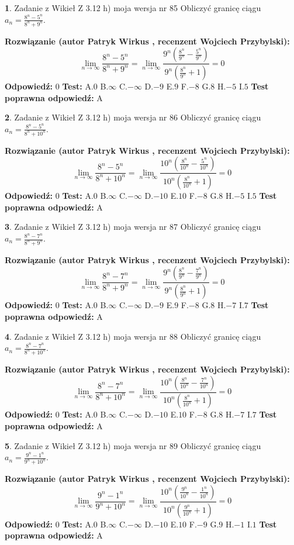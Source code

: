 \documentclass[12pt, a4paper]{article}
\theoremstyle{definition} %
\newtheorem{zad}{}
\newcommand{\zadStart}[1]{\begin{zad}#1\newline}
\newcommand{\zadStop}{\end{zad}}
\newcommand{\rozwStart}[2]{\noindent \textbf{Rozwiązanie (autor #1 , recenzent #2): }\newline}
\newcommand{\rozwStop}{\newline}
\newcommand{\odpStart}{\noindent \textbf{Odpowiedź:}\newline}
\newcommand{\odpStop}{\newline}
\newcommand{\testStart}{\noindent \textbf{Test:}\newline}
\newcommand{\testStop}{\newline}
\newcommand{\kluczStart}{\noindent \textbf{Test poprawna odpowiedź:}\newline}
\newcommand{\kluczStop}{\newline}
\begin{document}
\zadStart{Zadanie z Wikieł Z 3.12 h) moja wersja nr 85}
Obliczyć granicę ciągu $a_{n}=\frac{8^{n} - 5^{n}}{8^{n} + 9^{n}}$.
\zadStop
\rozwStart{Patryk Wirkus}{Wojciech Przybylski}
$$\lim\limits_{n\to\infty}\frac{8^{n} - 5^{n}}{8^{n} + 9^{n}} = \lim\limits_{n\to\infty}\frac{9^{n}(\frac{8^{n}}{9^{n}} - \frac{5^{n}}{9^{n}})}{9^{n}(\frac{8^{n}}{9^{n}} + 1)} = 0$$
\rozwStop
\odpStart
$0$
\odpStop
\testStart
A.$0$
B.$\infty$
C.$-\infty$
D.$-9$
E.$9$
F.$-8$
G.$8$
H.$-5$
I.$5$
\testStop
\kluczStart
A
\kluczStop



\zadStart{Zadanie z Wikieł Z 3.12 h) moja wersja nr 86}
Obliczyć granicę ciągu $a_{n}=\frac{8^{n} - 5^{n}}{8^{n} + 10^{n}}$.
\zadStop
\rozwStart{Patryk Wirkus}{Wojciech Przybylski}
$$\lim\limits_{n\to\infty}\frac{8^{n} - 5^{n}}{8^{n} + 10^{n}} = \lim\limits_{n\to\infty}\frac{10^{n}(\frac{8^{n}}{10^{n}} - \frac{5^{n}}{10^{n}})}{10^{n}(\frac{8^{n}}{10^{n}} + 1)} = 0$$
\rozwStop
\odpStart
$0$
\odpStop
\testStart
A.$0$
B.$\infty$
C.$-\infty$
D.$-10$
E.$10$
F.$-8$
G.$8$
H.$-5$
I.$5$
\testStop
\kluczStart
A
\kluczStop



\zadStart{Zadanie z Wikieł Z 3.12 h) moja wersja nr 87}
Obliczyć granicę ciągu $a_{n}=\frac{8^{n} - 7^{n}}{8^{n} + 9^{n}}$.
\zadStop
\rozwStart{Patryk Wirkus}{Wojciech Przybylski}
$$\lim\limits_{n\to\infty}\frac{8^{n} - 7^{n}}{8^{n} + 9^{n}} = \lim\limits_{n\to\infty}\frac{9^{n}(\frac{8^{n}}{9^{n}} - \frac{7^{n}}{9^{n}})}{9^{n}(\frac{8^{n}}{9^{n}} + 1)} = 0$$
\rozwStop
\odpStart
$0$
\odpStop
\testStart
A.$0$
B.$\infty$
C.$-\infty$
D.$-9$
E.$9$
F.$-8$
G.$8$
H.$-7$
I.$7$
\testStop
\kluczStart
A
\kluczStop



\zadStart{Zadanie z Wikieł Z 3.12 h) moja wersja nr 88}
Obliczyć granicę ciągu $a_{n}=\frac{8^{n} - 7^{n}}{8^{n} + 10^{n}}$.
\zadStop
\rozwStart{Patryk Wirkus}{Wojciech Przybylski}
$$\lim\limits_{n\to\infty}\frac{8^{n} - 7^{n}}{8^{n} + 10^{n}} = \lim\limits_{n\to\infty}\frac{10^{n}(\frac{8^{n}}{10^{n}} - \frac{7^{n}}{10^{n}})}{10^{n}(\frac{8^{n}}{10^{n}} + 1)} = 0$$
\rozwStop
\odpStart
$0$
\odpStop
\testStart
A.$0$
B.$\infty$
C.$-\infty$
D.$-10$
E.$10$
F.$-8$
G.$8$
H.$-7$
I.$7$
\testStop
\kluczStart
A
\kluczStop



\zadStart{Zadanie z Wikieł Z 3.12 h) moja wersja nr 89}
Obliczyć granicę ciągu $a_{n}=\frac{9^{n} - 1^{n}}{9^{n} + 10^{n}}$.
\zadStop
\rozwStart{Patryk Wirkus}{Wojciech Przybylski}
$$\lim\limits_{n\to\infty}\frac{9^{n} - 1^{n}}{9^{n} + 10^{n}} = \lim\limits_{n\to\infty}\frac{10^{n}(\frac{9^{n}}{10^{n}} - \frac{1^{n}}{10^{n}})}{10^{n}(\frac{9^{n}}{10^{n}} + 1)} = 0$$
\rozwStop
\odpStart
$0$
\odpStop
\testStart
A.$0$
B.$\infty$
C.$-\infty$
D.$-10$
E.$10$
F.$-9$
G.$9$
H.$-1$
I.$1$
\testStop
\kluczStart
A
\kluczStop
\end{document}
